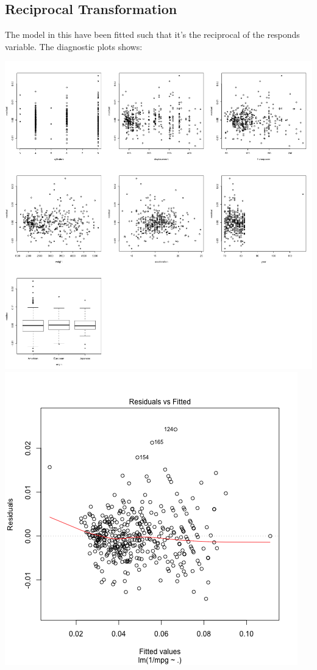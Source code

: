 \documentclass[11pt]{article} %
\begin{document}
\subsection{Reciprocal Transformation}
The model in this have been fitted such that it's the reciprocal of the responds variable. The diagnostic plots shows:
\begin{center}
\includegraphics[scale=0.13]{4_res_vs_value}
\includegraphics[scale=0.3]{4_res_vs_fitted}
\end{center}
\end{document}
